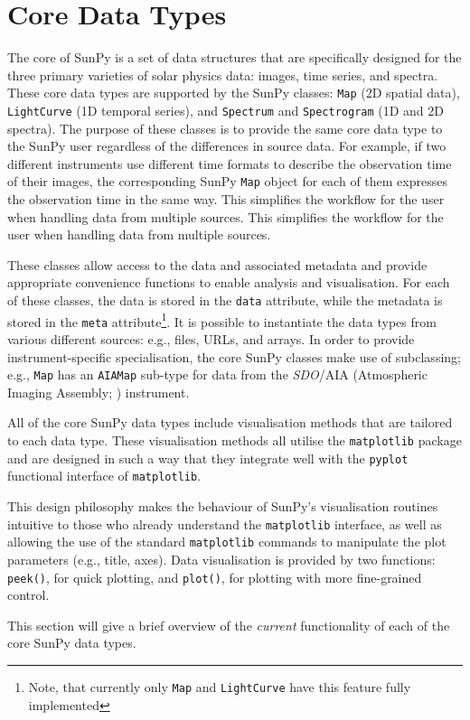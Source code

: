 \section{Core Data Types}\label{sec:DataTypes}

The core of SunPy is a set of data structures that are specifically
designed for the three primary varieties of solar physics data:
images, time series, and spectra. These core data types are supported
by the SunPy classes: \texttt{Map} (2D spatial data),
\texttt{LightCurve} (1D temporal series), and \texttt{Spectrum} and
\texttt{Spectrogram} (1D and 2D spectra).  The purpose of these
classes is to provide the same core data type to the SunPy user
regardless of the differences in source data.  For example, if two
different instruments use different time formats to describe the
observation time of their images, the corresponding SunPy \texttt{Map}
object for each of them expresses the observation time in the same
way.  This simplifies the workflow for the user when handling data
from multiple sources. This simplifies 
the workflow for the user when handling data from multiple sources.

These classes allow access to the data
and associated metadata and provide appropriate convenience functions to
enable analysis and visualisation. For each of these classes, the data is
stored in the \texttt{data} attribute, while the metadata is stored 
in the \texttt{meta} attribute\footnote{Note, that currently only \texttt{Map} and \texttt{LightCurve} have this feature 
fully implemented}. 
It is possible to instantiate the
data types from various
different sources: e.g., files, URLs, and arrays.  
In order to provide instrument-specific specialisation, the core SunPy classes 
make use of subclassing; e.g., \texttt{Map} has an \texttt{AIAMap} 
sub-type for data from the \textit{SDO}/AIA (Atmospheric Imaging Assembly; \citealt{lemen2012}) instrument. 

All of the core SunPy data types 
include visualisation methods that are tailored to each data type. 
These visualisation methods all utilise the \texttt{matplotlib} 
package and are designed in such a way that they integrate well with 
the \texttt{pyplot} functional interface of \texttt{matplotlib}.

This design philosophy makes the behaviour of SunPy's visualisation 
routines intuitive to those who already understand the \texttt{matplotlib}
interface, as well as allowing the use of the standard 
\texttt{matplotlib} commands to manipulate the plot parameters (e.g., title, axes).
Data visualisation is provided by two functions: \texttt{peek()}, for quick 
plotting, and \texttt{plot()}, for plotting with more fine-grained control.

This section will give a brief overview of the \textit{current} functionality 
of each of the core SunPy data types.




